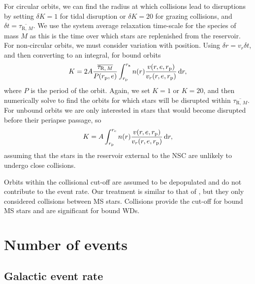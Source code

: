 For circular orbits, we can find the radius at which collisions lead to disruptions by setting $\delta K = 1$ for tidal disruption or $\delta K = 20$ for grazing collisions, and $\delta t = \overline{\tau_{\mathrm{R},\,M}}$. We use the system average relaxation time-scale for the species of mass $M$ as this is the time over which stars are replenished from the reservoir. For non-circular orbits, we must consider variation with position. Using $\delta r = v_r \delta t$, and then converting to an integral, for bound orbits
\begin{equation}
K = 2 A \dfrac{\overline{\tau_{\mathrm{R},\,M}}}{P(r_\mathrm{p},e)}\int_{r_\mathrm{p}}^{r_\mathrm{a}}{n(r)\dfrac{v(r,e,r_\mathrm{p})}{v_r(r,e,r_\mathrm{p})}}\,\mathrm{d}{r},
\label{eq:collision-K}
\end{equation}
where $P$ is the period of the orbit. Again, we set $K = 1$ or $K = 20$, and then numerically solve  to find the orbits for which stars will be disrupted within $\overline{\tau_{\mathrm{R},\,M}}$. For unbound orbits we are only interested in stars that would become disrupted before their periapse passage, so
\begin{equation}
K = A \int_{r_\mathrm{p}}^{r_\mathrm{c}}{n(r)\dfrac{v(r,e,r_\mathrm{p})}{v_r(r,e,r_\mathrm{p})}}\,\mathrm{d}{r},
\end{equation}
assuming that the stars in the reservoir external to the NSC are unlikely to undergo close collisions.

Orbits within the collisional cut-off are assumed to be depopulated and do not contribute to the event rate. Our treatment is similar to that of \citet{Hopman2007}, but they only considered collisions between MS stars. Collisions provide the cut-off for bound MS stars and are significant for bound WDs.

\section{Number of events}\label{sec:no-events}

\subsection{Galactic event rate}

